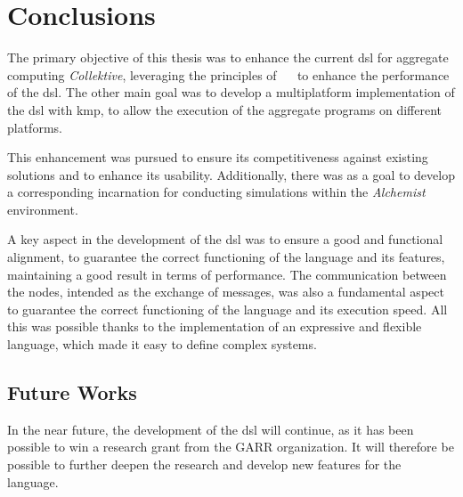 
\chapter{Conclusions}
\label{ch:conclusions}

The primary objective of this thesis was to enhance the current \ac{dsl} for aggregate computing \emph{Collektive},
leveraging the principles of ~\xc~ to enhance the performance of the \ac{dsl}.
The other main goal was to develop a multiplatform implementation of the \ac{dsl} with \ac{kmp}, to allow the execution
of the aggregate programs on different platforms.

This enhancement was pursued to ensure its competitiveness against existing solutions and to enhance its usability.
Additionally, there was as a goal to develop a corresponding incarnation for conducting simulations within the \emph{Alchemist} environment.

A key aspect in the development of the \ac{dsl} was to ensure a good and functional alignment, to guarantee
the correct functioning of the language and its features, maintaining a good result in terms of performance.
The communication between the nodes, intended as the exchange of messages, was also a fundamental aspect to guarantee
the correct functioning of the language and its execution speed.
All this was possible thanks to the implementation of an expressive and flexible language, which made it easy to define complex systems.

\section{Future Works}
\label{sec:future-works}
In the near future, the development of the \ac{dsl} will continue, as it has been possible to win a research grant from the GARR organization.
It will therefore be possible to further deepen the research and develop new features for the language.

